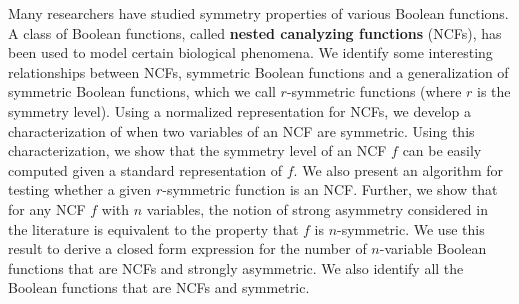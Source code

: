 Many researchers have studied symmetry properties of 
various Boolean functions. 
A class of Boolean functions, 
called \textbf{nested canalyzing functions} (NCFs),
has been used to model certain biological phenomena.
We identify some interesting relationships between NCFs, symmetric 
Boolean functions and a generalization of symmetric Boolean functions,
which we call $r$-symmetric functions (where $r$ is the symmetry level).
Using a normalized representation for NCFs, we develop a 
characterization of when two variables of an NCF are symmetric.
Using this characterization, we show 
that the symmetry level of an NCF $f$
can be easily computed given a standard representation of $f$.
We also present an algorithm for testing whether 
a given $r$-symmetric function is an NCF.
Further, we show that for any NCF $f$ with $n$ variables, the notion of
strong asymmetry considered in the literature is equivalent to
the property that $f$ is $n$-symmetric. 
We use this result to derive a closed form expression for the
number of $n$-variable Boolean functions 
that are NCFs and strongly asymmetric.
We also identify all the Boolean functions that are NCFs 
and symmetric. 
